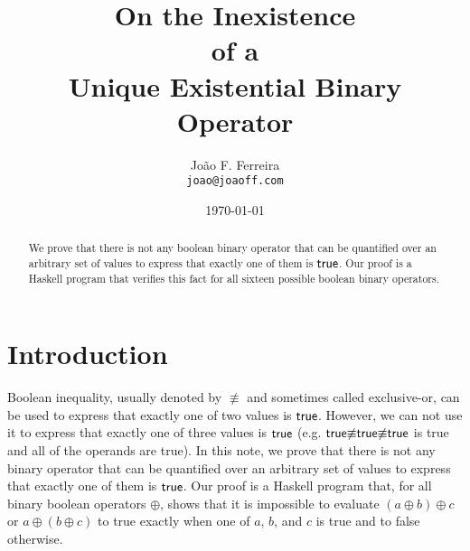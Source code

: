 \documentclass[leqno,fleqn,12pt]{article}
\title{On the Inexistence\\
       of a\\
       Unique Existential Binary Operator}
\author{
   Jo\~ao F. Ferreira \\{\tt\small joao@joaoff.com}
}
\date{\today}
\begin{document}
\maketitle

\begin{abstract}
We prove that there is not any boolean binary operator that can be quantified over an 
arbitrary set of values to express that exactly one of them is $\sf{true}$. 
Our proof is a Haskell program that verifies this fact for all sixteen
possible boolean binary operators.
\end{abstract}


\section{Introduction}
Boolean inequality, usually denoted by $\not\equiv$ and sometimes called exclusive-or, can be used to express
that exactly one of two values is ${\sf true}$. However, we can not use it to express
that exactly one of three values is ${\sf true}$ (e.g. ${\sf true}{\not\equiv}{\sf true}{\not\equiv}{\sf true}$ is {\sf true} and all of the operands are {\sf true}). In this note, we prove that there
is not any binary operator that can be quantified over an arbitrary set of values to express that
exactly one of them is $\sf{true}$. Our proof is a Haskell program that, for all binary boolean operators $\oplus$, shows that it is impossible to evaluate $(a{\oplus}b){\oplus}c$ or $a{\oplus}(b{\oplus}c)$ to
{\sf true} exactly when one of $a$, $b$, and $c$ is {\sf true} and to {\sf false} otherwise.
\end{document}
